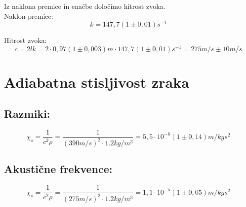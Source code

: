 \documentclass[a4paper]{report}
\begin{document}
\noindent Iz naklona premice in enačbe določimo hitrost zvoka. \\
Naklon premice: \\

  \[k =147,7 (1 \pm 0,01) s^{-1}\]

\noindent Hitrost zvoka:
\begin{equation}
  c = 2lk = 2 \cdot 0,97(1 \pm 0,003)m \cdot 147,7(1 \pm 0,01)s^{-1} = 275m/s \pm 10 m/s
\end{equation}
  


\chapter*{Adiabatna stisljivost zraka}

\section*{Razmiki:}

\begin{equation}
  \chi_s = \frac{1}{c^2 \rho} = \frac{1}{(390 m/s)^2 \cdot 1.2 kg/m^3} = 5,5 \cdot 10^{-6} (1 \pm 0,14) m/kgs^2
\end{equation}

\section*{Akustične frekvence:}

\begin{equation}
  \chi_s = \frac{1}{c^2 \rho} = \frac{1}{(275 m/s)^2 \cdot 1.2 kg/m^3} = 1,1 \cdot 10^{-5} (1 \pm 0,05)m/kgs^2
\end{equation}
\end{document}
